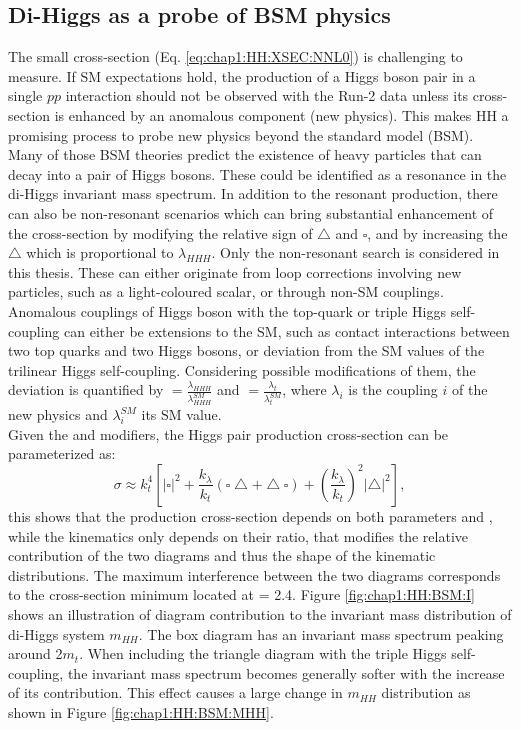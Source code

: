 \subsection{Di-Higgs as a probe of BSM physics}
\label{chap1:HH:BSM}
The small cross-section (Eq. \ref{eq:chap1:HH:XSEC:NNL0}) is challenging to measure. If SM expectations hold, the production of a Higgs boson pair in a single $pp$ interaction should not be observed with the Run-2 data unless its cross-section is enhanced by an anomalous component (new physics). This makes HH a promising process to probe new physics beyond the standard model (BSM). Many of those BSM theories predict the existence of heavy particles that can decay into a pair of Higgs bosons. These could be identified as a resonance in the di-Higgs invariant mass spectrum. In addition to the resonant production, there can also be non-resonant scenarios which can bring substantial enhancement of the cross-section by modifying the relative sign of $\bigtriangleup$ and $\square$, and by increasing the $\bigtriangleup$ which is proportional to $\lambda_{HHH}$. Only the non-resonant search is considered in this thesis. These can either originate from loop corrections involving new particles, such as a light-coloured scalar, or through non-SM couplings. Anomalous couplings of Higgs boson with the top-quark or triple Higgs self-coupling can either be extensions to the SM, such as contact interactions between two top quarks and two Higgs bosons, or deviation from the SM values of the trilinear Higgs self-coupling. Considering possible modifications of them, the deviation is quantified by \kl $ = \frac{\lambda_{HHH}}{\lambda_{HHH}^{SM}}$ and \kt $= \frac{\lambda_{t}}{\lambda_{t}^{SM}}$, where $\lambda_{i}$ is the coupling $i$ of the new physics and $\lambda_{i}^{SM}$ its SM value. \\
Given the \kt and \kl modifiers, the Higgs pair production cross-section can be parameterized as:
\begin{equation}
  \sigma \approx k_{t}^{4}\left[|\square|^{2}+\frac{k_{\lambda}}{k_{t}}(\square\bigtriangleup+\bigtriangleup \square)+\left(\frac{k_{\lambda}}{k_{t}}\right)^{2}|\bigtriangleup|^{2}\right], 
  \label{eq:chap1:HH:XSEC:Param}
\end{equation}
this shows that the production cross-section depends on both parameters \kt and \kl, while the kinematics only depends on their ratio, that modifies the relative contribution of the two diagrams and thus the shape of the kinematic distributions. The maximum interference between the two diagrams corresponds to the cross-section minimum located at \kl = 2.4\kt. Figure \ref{fig:chap1:HH:BSM:I} shows an illustration of diagram contribution to the invariant mass distribution of di-Higgs system $m_{HH}$. The box diagram has an invariant mass spectrum peaking around 2$m_t$. When including the triangle diagram with the triple Higgs self-coupling, the invariant mass spectrum becomes generally softer with the increase of its contribution. This effect causes a large change in $m_{HH}$ distribution as shown in Figure \ref{fig:chap1:HH:BSM:MHH}.
